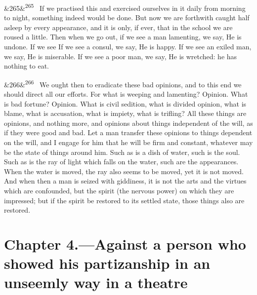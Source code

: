 \documentclass[12pt]{article}
\newcommand{\para}[1][]{\par\noindent\ifx&#1&\else\textsuperscript{\footnotesize #1}~\fi}
\begin{document}
\para[265] If we practised this and exercised ourselves in it daily from morning to night, something indeed would be done. But now we are forthwith caught half asleep by every appearance, and it is only, if ever, that in the school we are roused a little. Then when we go out, if we see a man lamenting, we say, He is undone. If we see If we see a consul, we say, He is happy. If we see an exiled man, we say, He is miserable. If we see a poor man, we say, He is wretched: he has nothing to eat.

\para[266] We ought then to eradicate these bad opinions, and to this end we should direct all our efforts. For what is weeping and lamenting? Opinion. What is bad fortune? Opinion. What is civil sedition, what is divided opinion, what is blame, what is accusation, what is impiety, what is trifling? All these things are opinions, and nothing more, and opinions about things independent of the will, as if they were good and bad. Let a man transfer these opinions to things dependent on the will, and I engage for him that he will be firm and constant, whatever may be the state of things around him. Such as is a dish of water, such is the soul. Such as is the ray of light which falls on the water, such are the appearances. When the water is moved, the ray also seems to be moved, yet it is not moved. And when then a man is seized with giddiness, it is not the arts and the virtues which are confounded, but the spirit (the nervous power) on which they are impressed; but if the spirit be restored to its settled state, those things also are restored.

\section*{Chapter 4.---Against a person who showed his partizanship in an unseemly way in a theatre}
\end{document}
